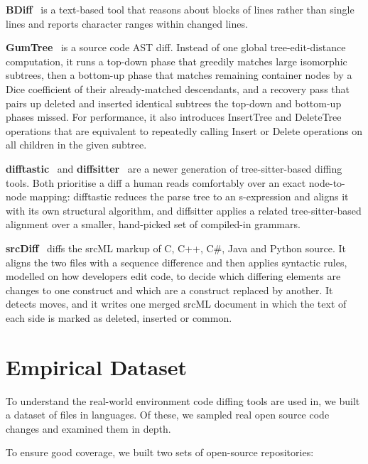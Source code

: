 \documentclass[sigconf]{acmart}
\begin{document}
\textbf{BDiff}~\cite{bdiff} is a text-based tool that reasons about blocks of lines rather
than single lines and reports character ranges within changed lines.

\textbf{GumTree}~\cite{gumtreediff-2014} is a source code AST diff. Instead of one global
tree-edit-distance computation, it runs a top-down phase that greedily matches large
isomorphic subtrees, then a bottom-up phase that matches remaining container nodes by a Dice
coefficient of their already-matched descendants, and a recovery pass that pairs up deleted and
inserted identical subtrees the top-down and bottom-up phases missed. For performance, it also introduces InsertTree and DeleteTree operations
that are equivalent to repeatedly calling Insert or Delete operations on all children in the given
subtree.

\textbf{difftastic}~\cite{difftastic} and \textbf{diffsitter}~\cite{diffsitter} are a newer
generation of tree-sitter-based diffing tools. Both prioritise a diff a human reads
comfortably over an exact node-to-node mapping: difftastic reduces the parse tree to an s-expression
and aligns it with its own structural algorithm, and diffsitter applies a related tree-sitter-based
alignment over a smaller, hand-picked set of compiled-in grammars.

\textbf{srcDiff}~\cite{decker-2020} diffs the srcML markup of C, C++, C\#, Java and Python
source. It aligns the two files with a sequence difference and then applies syntactic rules,
modelled on how developers edit code, to decide which differing elements are changes to one
construct and which are a construct replaced by another. It detects moves, and it writes one merged
srcML document in which the text of each side is marked as deleted, inserted or common.

\section{Empirical Dataset}
\label{sec:dataset}

To understand the real-world environment code diffing tools are used in, we built a dataset of \NumFiles{}
files in \NumLanguages{} languages. Of these, we sampled \NumFixtures{} real open source code
changes and examined them in depth.

To ensure good coverage, we built two sets of open-source repositories:
\end{document}
